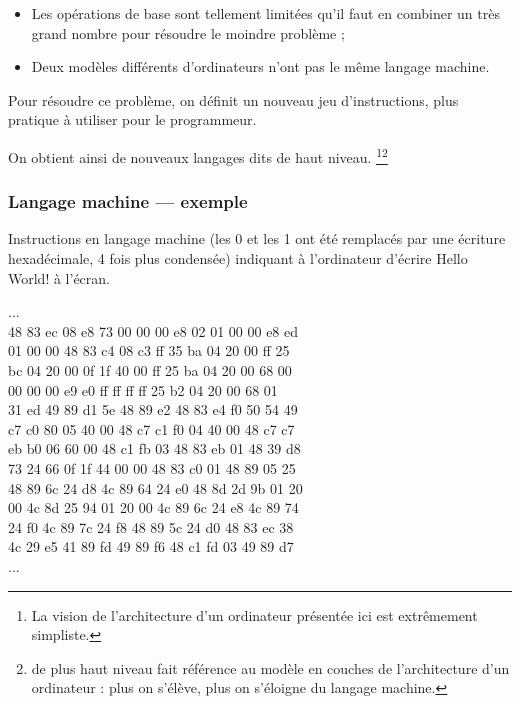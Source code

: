 \documentclass[utf8,10pt]{beamer}
\begin{document}
\begin{frame}[allowframebreaks=0.95]
\begin{itemize}
\begin{itemize}
            \item Les opérations de base sont tellement limitées qu'il faut en combiner un très grand nombre
            pour résoudre le moindre problème ;
            
            \item Deux modèles différents d'ordinateurs n'ont pas le même langage machine.
            
        \end{itemize} 
    \end{itemize}
    
    Pour résoudre ce problème, on définit un nouveau jeu d'instructions, plus pratique à utiliser pour le 
    programmeur. 
    
    On obtient ainsi de nouveaux langages dits de \og haut niveau. \fg\footnote{La vision de 
    l'architecture d'un ordinateur présentée ici est extrêmement simpliste.}\footnote{\og de plus haut niveau \fg{}
    fait référence au modèle en couches de l'architecture d'un ordinateur : plus on s'élève, plus on s'éloigne
    du langage machine.}\\[6pt]
    \hfill \hyperlink{http://fr.wikipedia.org/wiki/Langage_de_haut_niveau}{}
\end{frame}

\begin{frame}
    \frametitle{Langage machine --- exemple}
    
    Instructions en langage machine (les 0 et les 1 ont été remplacés par une écriture hexadécimale, 4 fois plus condensée) indiquant à l’ordinateur d’écrire \og Hello World! \fg{} à l’écran.    
    \begin{block}{}
...\\
48 83 ec 08 e8 73 00 00  00 e8 02 01 00 00 e8 ed \\
01 00 00 48 83 c4 08 c3  ff 35 ba 04 20 00 ff 25 \\
bc 04 20 00 0f 1f 40 00  ff 25 ba 04 20 00 68 00 \\
00 00 00 e9 e0 ff ff ff  ff 25 b2 04 20 00 68 01 \\
31 ed 49 89 d1 5e 48 89  e2 48 83 e4 f0 50 54 49 \\
c7 c0 80 05 40 00 48 c7  c1 f0 04 40 00 48 c7 c7 \\
eb b0 06 60 00 48 c1 fb  03 48 83 eb 01 48 39 d8 \\
73 24 66 0f 1f 44 00 00  48 83 c0 01 48 89 05 25 \\
48 89 6c 24 d8 4c 89 64  24 e0 48 8d 2d 9b 01 20 \\
00 4c 8d 25 94 01 20 00  4c 89 6c 24 e8 4c 89 74 \\
24 f0 4c 89 7c 24 f8 48  89 5c 24 d0 48 83 ec 38 \\
4c 29 e5 41 89 fd 49 89  f6 48 c1 fd 03 49 89 d7 \\
...
    \end{block}

    \end{frame}
\end{document}
